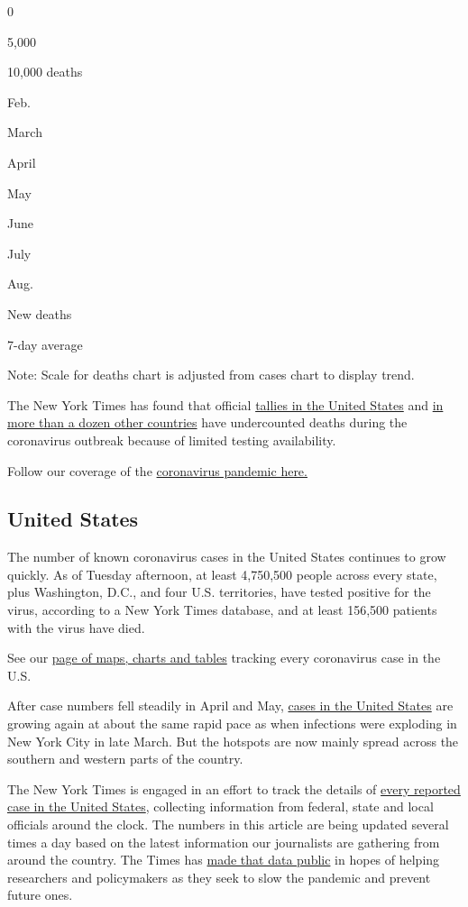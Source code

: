 0

5,000

10,000 deaths

Feb.

March

April

May

June

July

Aug.

New deaths

7-day average

Note: Scale for deaths chart is adjusted from cases chart to display
trend.

The New York Times has found that official
\href{https://www.nytimes.com/interactive/2020/04/28/us/coronavirus-death-toll-total.html}{tallies
in the United States} and
\href{https://www.nytimes.com/interactive/2020/04/21/world/coronavirus-missing-deaths.html}{in
more than a dozen other countries} have undercounted deaths during the
coronavirus outbreak because of limited testing availability.

Follow our coverage of the
\href{https://www.nytimes.com/2020/08/04/world/coronavirus-covid-19.html}{coronavirus
pandemic here.}

\hypertarget{united-states}{%
\subsection{United States}\label{united-states}}

The number of known coronavirus cases in the United States continues to
grow quickly. As of Tuesday afternoon, at least 4,750,500 people across
every state, plus Washington, D.C., and four U.S. territories, have
tested positive for the virus, according to a New York Times database,
and at least 156,500 patients with the virus have died.

See our
\href{https://www.nytimes.com/interactive/2020/us/coronavirus-us-cases.html}{page
of maps, charts and tables} tracking every coronavirus case in the U.S.

After case numbers fell steadily in April and May,
\href{https://www.nytimes.com/interactive/2020/us/coronavirus-us-cases.html}{cases
in the United States} are growing again at about the same rapid pace as
when infections were exploding in New York City in late March. But the
hotspots are now mainly spread across the southern and western parts of
the country.

The New York Times is engaged in an effort to track the details of
\href{https://www.nytimes.com/interactive/2020/us/coronavirus-us-cases.html}{every
reported case in the United States}, collecting information from
federal, state and local officials around the clock. The numbers in this
article are being updated several times a day based on the latest
information our journalists are gathering from around the country. The
Times has
\href{https://www.nytimes.com/article/coronavirus-county-data-us.html?action=click\&module=Spotlight\&pgtype=Homepage}{made
that data public} in hopes of helping researchers and policymakers as
they seek to slow the pandemic and prevent future ones.

